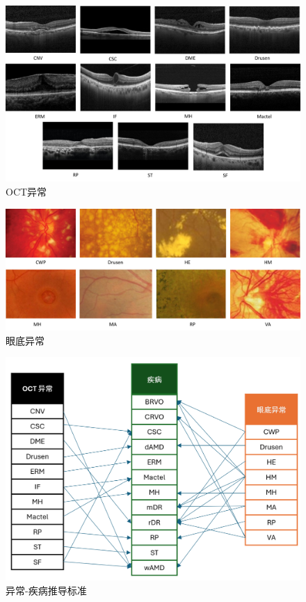 \documentclass{article}
\begin{document}
	\begin{figure}[htbp]
		\centering
		\includegraphics[width=\linewidth]{Figs/OCT_Abnormities.pdf}
		\caption{OCT异常 \autocite{Duker_Waheed_Goldman_2022}}
		\vspace{0.3cm}
		\label{fig:OCT_abnormities}
	\end{figure}
	
	\begin{figure}[htbp]
		\centering
		\includegraphics[width=\linewidth]{Figs/fundus_Abnormities.pdf}
		\caption{眼底异常 \autocite{Wolf_Kirchhof_Reim_2006}}
		\vspace{0.3cm}
		\label{fig:fundus_abnormities}
	\end{figure}
	
	\begin{figure}[htbp]
		\centering
		\includegraphics[width=0.7\linewidth]{Figs/criteria.png}
		\caption{异常-疾病推导标准}
		\vspace{0.3cm}
		\label{fig:criteria}
	\end{figure}
\end{document}
